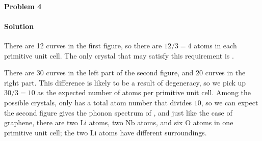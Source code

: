 \documentclass[hyperref, a4paper]{article}
\begin{document}
\paragraph{Problem 4}

\paragraph{Solution} There are 12 curves in the first figure, 
so there are $12 / 3 = 4$ atoms in each primitive unit cell.
The only crystal that may satisfy this requirement is .

There are 30 curves in the left part of the second figure,
and 20 curves in the right part.
This difference is likely to be a result of degeneracy,
so we pick up $30 / 3 = 10$ as the expected number of atoms per primitive unit cell.
Among the possible crystals,
only  has a total atom number that divides $10$,
so we can expect the second figure gives the phonon spectrum of ,
and just like the case of graphene,
there are two Li atoms, two Nb atoms, and six O atoms in one primitive unit cell;
the two Li atoms have different surroundings.



\end{document}
